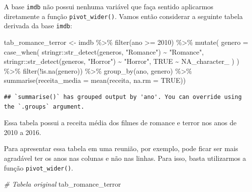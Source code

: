 \documentclass[
]{book}
\newenvironment{Shaded}{\begin{snugshade}}{\end{snugshade}}
\newcommand{\AttributeTok}[1]{\textcolor[rgb]{0.77,0.63,0.00}{#1}}
\newcommand{\CommentTok}[1]{\textcolor[rgb]{0.56,0.35,0.01}{\textit{#1}}}
\newcommand{\ConstantTok}[1]{\textcolor[rgb]{0.00,0.00,0.00}{#1}}
\newcommand{\DecValTok}[1]{\textcolor[rgb]{0.00,0.00,0.81}{#1}}
\newcommand{\FunctionTok}[1]{\textcolor[rgb]{0.00,0.00,0.00}{#1}}
\newcommand{\NormalTok}[1]{#1}
\newcommand{\OtherTok}[1]{\textcolor[rgb]{0.56,0.35,0.01}{#1}}
\newcommand{\SpecialCharTok}[1]{\textcolor[rgb]{0.00,0.00,0.00}{#1}}
\newcommand{\StringTok}[1]{\textcolor[rgb]{0.31,0.60,0.02}{#1}}
\begin{document}
A base \texttt{imdb} não possui nenhuma variável que faça sentido aplicarmos diretamente a função \texttt{pivot\_wider()}. Vamos então considerar a seguinte tabela derivada da base \texttt{imdb}:

\begin{Shaded}
\begin{Highlighting}[]
\NormalTok{tab\_romance\_terror }\OtherTok{\textless{}{-}}\NormalTok{ imdb }\SpecialCharTok{\%\textgreater{}\%}
  \FunctionTok{filter}\NormalTok{(ano }\SpecialCharTok{\textgreater{}=} \DecValTok{2010}\NormalTok{) }\SpecialCharTok{\%\textgreater{}\%}
  \FunctionTok{mutate}\NormalTok{(}
    \AttributeTok{genero =} \FunctionTok{case\_when}\NormalTok{(}
\NormalTok{      stringr}\SpecialCharTok{::}\FunctionTok{str\_detect}\NormalTok{(generos, }\StringTok{"Romance"}\NormalTok{) }\SpecialCharTok{\textasciitilde{}} \StringTok{"Romance"}\NormalTok{,}
\NormalTok{      stringr}\SpecialCharTok{::}\FunctionTok{str\_detect}\NormalTok{(generos, }\StringTok{"Horror"}\NormalTok{) }\SpecialCharTok{\textasciitilde{}} \StringTok{"Horror"}\NormalTok{,}
      \ConstantTok{TRUE} \SpecialCharTok{\textasciitilde{}} \ConstantTok{NA\_character\_}
\NormalTok{    )}
\NormalTok{  ) }\SpecialCharTok{\%\textgreater{}\%}
  \FunctionTok{filter}\NormalTok{(}\SpecialCharTok{!}\FunctionTok{is.na}\NormalTok{(genero)) }\SpecialCharTok{\%\textgreater{}\%}
  \FunctionTok{group\_by}\NormalTok{(ano, genero) }\SpecialCharTok{\%\textgreater{}\%}
  \FunctionTok{summarise}\NormalTok{(}\AttributeTok{receita\_media =} \FunctionTok{mean}\NormalTok{(receita, }\AttributeTok{na.rm =} \ConstantTok{TRUE}\NormalTok{))}
\end{Highlighting}
\end{Shaded}

\begin{verbatim}
## `summarise()` has grouped output by 'ano'. You can override using the `.groups` argument.
\end{verbatim}

Essa tabela possui a receita média dos filmes de romance e terror nos anos de 2010 a 2016.

Para apresentar essa tabela em uma reunião, por exemplo, pode ficar ser mais agradável ter os anos nas colunas e não nas linhas. Para isso, basta utilizarmos a função \texttt{pivot\_wider()}.

\begin{Shaded}
\begin{Highlighting}[]
\CommentTok{\# Tabela original}
\NormalTok{tab\_romance\_terror}
\end{Highlighting}
\end{Shaded}
\end{document}
